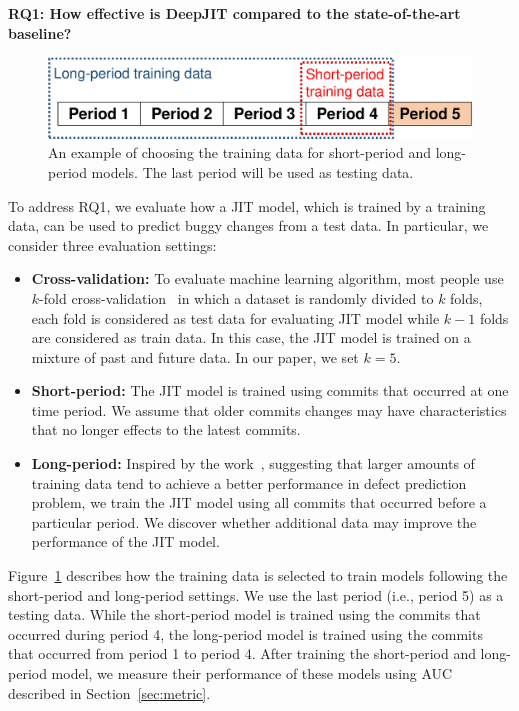 \noindent \textbf{RQ1: How effective is DeepJIT compared to the state-of-the-art baseline?}

\begin{figure}
	\center
	\includegraphics[scale=0.36]{figs/split.pdf}
	\caption{An example of choosing the training data for short-period and long-period models. The last period will be used as testing data.}
	\label{fig:splitting}
\end{figure}

To address RQ1, we evaluate how a JIT model, which is trained by a training data, can be used to predict buggy changes from a test data. In particular, we consider three evaluation settings: 
\begin{itemize}
\item \textbf{Cross-validation:} To evaluate machine learning algorithm, most people use $k$-fold cross-validation~\cite{kohavi1995study} in which a dataset is randomly divided to $k$ folds, each fold is considered as test data for evaluating JIT model while $k - 1$ folds are considered as train data. In this case, the JIT model is trained on a mixture of past and future data. In our paper, we set $k = 5$.
\item \textbf{Short-period:} The JIT model is trained using commits that occurred at one time period. We assume that older commits changes may have characteristics that no longer effects to the latest commits. 
\item \textbf{Long-period:} Inspired by the work~\cite{rahman2013sample}, suggesting that larger amounts of training data tend to achieve a better performance in defect prediction problem, we train the JIT model using all commits that occurred before a particular period. We discover whether additional data may improve the performance of the JIT model. 
\end{itemize} 

Figure~\ref{fig:splitting} describes how the training data is selected to train models  following the short-period and long-period settings. We use the last period (i.e., period 5) as a testing data. While the short-period model is trained using the commits that occurred during period 4, the long-period model is trained using the commits that occurred from period 1 to period 4. After training the short-period and long-period model, we measure their performance of these models using AUC described in Section~\ref{sec:metric}.

